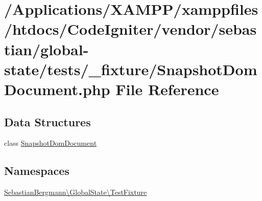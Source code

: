 \hypertarget{_snapshot_dom_document_8php}{}\section{/\+Applications/\+X\+A\+M\+P\+P/xamppfiles/htdocs/\+Code\+Igniter/vendor/sebastian/global-\/state/tests/\+\_\+fixture/\+Snapshot\+Dom\+Document.php File Reference}
\label{_snapshot_dom_document_8php}
\subsection*{Data Structures}
\begin{DoxyCompactItemize}
\item 
class \mbox{\hyperlink{class_sebastian_bergmann_1_1_global_state_1_1_test_fixture_1_1_snapshot_dom_document}{Snapshot\+Dom\+Document}}
\end{DoxyCompactItemize}
\subsection*{Namespaces}
\begin{DoxyCompactItemize}
\item 
 \mbox{\hyperlink{namespace_sebastian_bergmann_1_1_global_state_1_1_test_fixture}{Sebastian\+Bergmann\textbackslash{}\+Global\+State\textbackslash{}\+Test\+Fixture}}
\end{DoxyCompactItemize}
